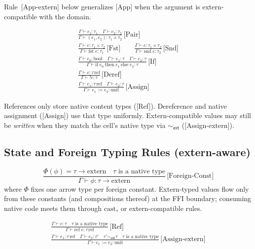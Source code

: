 \documentclass[11pt,a4paper]{article}
\begin{document}
Rule~\textsf{[App-extern]} below generalizes \textsf{[App]} when the argument is extern-compatible with the domain.


\begin{gather*}
  \frac{\Gamma \vdash e_1 : \tau_1 \quad \Gamma \vdash e_2 : \tau_2}{\Gamma \vdash (e_1, e_2) : \tau_1 \times \tau_2}\,\text{[Pair]}
  \\[0.75em]
  \frac{\Gamma \vdash e : \tau_1 \times \tau_2}{\Gamma \vdash \text{fst}\; e : \tau_1}\,\text{[Fst]}
  \qquad
  \frac{\Gamma \vdash e : \tau_1 \times \tau_2}{\Gamma \vdash \text{snd}\; e : \tau_2}\,\text{[Snd]}
  \\[0.75em]
  \frac{\Gamma \vdash e_0 : \text{bool} \quad \Gamma \vdash e_1 : \tau \quad \Gamma \vdash e_2 : \tau}{\Gamma \vdash \text{if}\; e_0\ \text{then}\; e_1\ \text{else}\; e_2 : \tau}\,\text{[If]}
  \\[0.75em]
  \frac{\Gamma \vdash e : \tau\,\text{ref}}{\Gamma \vdash {!}e : \tau}\,\text{[Deref]}
  \\[0.75em]
  \frac{\Gamma \vdash e_1 : \tau\,\text{ref} \quad \Gamma \vdash e_2 : \tau}{\Gamma \vdash e_1 \mathrel{:=} e_2 : \text{unit}}\,\text{[{Assign}]}
\end{gather*}

References only store native content types (\textsf{[Ref]}). Dereference and native assignment (\textsf{[{Assign}]}) use that type uniformly. Extern-compatible values may still be \emph{written} when they match the cell's native type via $\sim_{\textsf{ext}}$ (\textsf{[{Assign-extern}]}).

\subsection{State and Foreign Typing Rules (extern-aware)}
\[
  \frac{\Phi(\phi) = \tau \to \text{extern} \quad \text{$\tau$ is a native type}}{\Gamma \vdash \phi : \tau \to \text{extern}}\,\text{[{Foreign-Const}]}
\]
where $\Phi$ fixes one arrow type per foreign constant.
Extern-typed values flow only from these constants (and compositions thereof) at the FFI boundary; consuming native code meets them through $\text{cast}_{\tau}$ or extern-compatible rules.

\begin{gather*}
  \frac{\Gamma \vdash e : \tau \quad \text{$\tau$ is a native type}}{\Gamma \vdash \text{ref}\; e : \tau\,\text{ref}}\,\text{[Ref]}
  \\[0.75em]
  \frac{\Gamma \vdash e_1 : \tau\,\text{ref} \quad \Gamma \vdash e_2 : \tau' \quad \tau' \sim_{\textsf{ext}} \tau \quad \text{$\tau$ is a native type}}{\Gamma \vdash e_1 \mathrel{:=} e_2 : \text{unit}}\,\text{[{Assign-extern}]}
\end{gather*}
\end{document}
